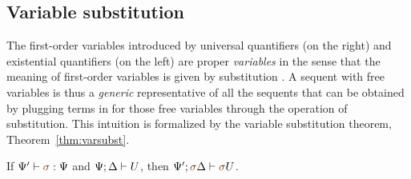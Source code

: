 \subsection{Variable substitution}

The first-order variables introduced by universal quantifiers (on the
right) and existential quantifiers (on the left) are proper {\it
  variables} in the sense that the meaning of first-order variables is
given by substitution \cite[Chapter 1]{harper12practical}. A sequent
with free variables is thus a {\it generic} representative of all the
sequents that can be obtained by plugging terms in for those free
variables through the operation of substitution. This intuition is
formalized by the variable substitution theorem,
Theorem~\ref{thm:varsubst}.

\bigskip
\begin{theorem}
\label{thm:varsubst}
If $\Psi' \vdash \lf\sigma : \Psi$ and ${\Psi};{\Delta} \vdash {U} \mathstrut$, then 
$\foc{\Psi'}{\lf\sigma\Delta}{\lf\sigma{U}}$.
\end{theorem}

